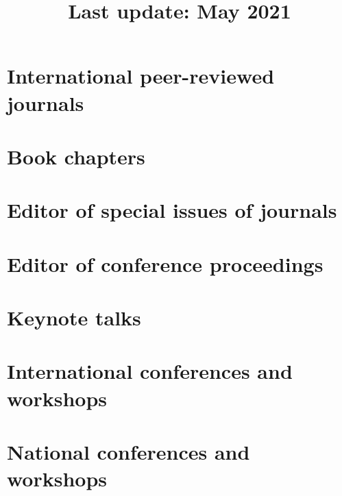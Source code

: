 \documentclass[12pt,a4paper,sans]{moderncv}
\title{\normalsize Last update: May 2021}
\begin{document}
\makecvtitle

\nocite{*}

\sloppy

\section{International peer-reviewed journals}

\printbibliography[filter=revue, heading=none]

\section{Book chapters}

\printbibliography[filter=chap, heading=none]

\section{Editor of special issues of journals}

\printbibliography[filter=dirRevue, heading=none]

\section{Editor of conference proceedings}

\printbibliography[filter=dirActes, heading=none]

\section{Keynote talks}

\printbibliography[filter=confInvit, heading=none]


\section{International conferences and workshops}

\printbibliography[filter=confInt, heading=none]


\section{National conferences and workshops}

\printbibliography[filter=confNat, heading=none]
\end{document}
